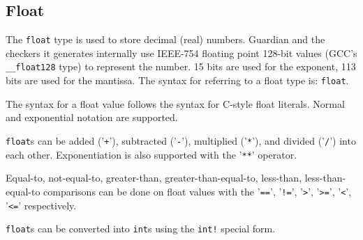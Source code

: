 
\subsection{Float}
{
	The \texttt{float} type is used to store decimal (real) numbers.
	Guardian and the checkers it generates internally
	use IEEE-754 floating point
	128-bit values (GCC's \texttt{\_\_float128} type) to represent the number.
	15 bits are used for the exponent, 113 bits are used for the mantissa.
	The syntax for referring to a float type is: \texttt{float}.
	
	The syntax for a float value follows the syntax for C-style float literals.
	Normal and exponential notation are supported.
	
	\texttt{float}s can be added ('\texttt{+}'),
	subtracted ('\texttt{-}'), multiplied ('\texttt{*}'), and
	divided ('\texttt{/}') into each
	other. Exponentiation is also supported
	with the '\texttt{**}' operator.
	
	Equal-to, not-equal-to, greater-than, greater-than-equal-to,
	less-than, less-than-equal-to comparisons can be done on float values with
	the '\texttt{==}', '\texttt{!=}',
	'\texttt{>}', '\texttt{>=}', '\texttt{<}', '\texttt{<=}' respectively.
	
	\texttt{float}s can be converted into \texttt{int}s using
	the \texttt{int!}
	special form.
}

